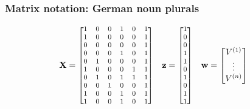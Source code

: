 \documentclass[t]{beamer} %
\begin{document}
\begin{frame}
  \frametitle{Matrix notation: German noun plurals}
  
  \ungap[2]
  \begin{align*}
    \vX &=
    \footnotesize\begin{bmatrix}
      1 & 0 & 0 & 1 & 0 & 1 \\ 
      1 & 0 & 0 & 0 & 0 & 1 \\ 
      0 & 0 & 0 & 0 & 0 & 1 \\ 
      0 & 0 & 0 & 1 & 0 & 1 \\ 
      0 & 1 & 0 & 0 & 0 & 1 \\ 
      1 & 0 & 0 & 0 & 1 & 1 \\ 
      0 & 1 & 0 & 1 & 1 & 1 \\ 
      0 & 0 & 1 & 0 & 0 & 1 \\      
      1 & 0 & 0 & 1 & 0 & 1 \\ 
      1 & 0 & 0 & 1 & 0 & 1
    \end{bmatrix}
    &
    \vz &=
    \footnotesize\begin{bmatrix}
      1  \\
      0  \\
      0  \\
      1  \\
      1  \\
      0  \\
      1  \\
      0  \\
      1  \\
      1 
    \end{bmatrix}
    &
    \vw &=
    \begin{bmatrix}
      V\psup{1} \\
      \vdots \\
      V\psup{n}
    \end{bmatrix}
  \end{align*}
  

\end{frame}
\end{document}

